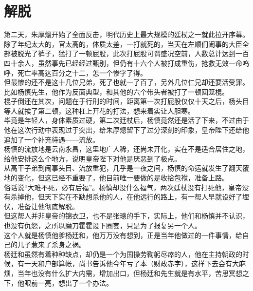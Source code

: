 \section{解脱}
\ifnum{}
	\begin{multicols}{\theparacolNo}
\fi
第二天，朱厚熜开始了全面反击，明代历史上最大规模的廷杖之一就此拉开序幕。\\

除了年纪太大的，官太高的，体质太差，一打就死的，当天在左顺们闹事的大臣全部被脱光了裤子，猛打了一顿屁股，此次打屁股可谓盛况空前，人数总计达到一百四十余人，虽然事先已经经过甄别，但仍有十六个人被打成重伤，抢救无效一命呜呼，死亡率高达百分之十二，怎一个惨字了得。\\

但最惨的还不是这十几位兄弟，死了也就一了百了，另外几位仁兄却还要活受罪。比如杨慎先生，他作为反面典型，和其他的六个带头者被打了一顿回笼棍。\\

棍子倒还在其次，问题在于行刑的时间，距离第一次打屁股仅仅十天之后，杨头目等人就挨了第二顿，这种杠上开花的打法，想来着实让人胆寒。\\

毕竟是年轻人，身体素质过硬，第二次廷杖后，杨慎竟然还是活了下来，不过由于他在这次行动中表现过于突出，给朱厚熜留下了过分深刻的印象，皇帝陛下还给他追加了一个补充待遇——流放。\\

杨慎的流放地是云南永昌，这里地广人稀，还尚未开化，实在不是适合居住之地，给他安排这么个地方，说明皇帝陛下对他是厌恶到了极点。\\

从高干子弟到闹事头目、流放重犯，几乎是一夜之间，杨慎的命运就发生了翻天覆地的变化，但这已经不重要了，他目前唯一要做的是收拾包袱，准备上路。\\

俗话说“大难不死，必有后福”。杨慎却没什么福气，两次廷杖没有打死他，皇帝没有杀掉他，但天下实在不缺想杀他的人，在他远行的路上，有一帮人早就设好了埋伏，准备让他彻底解脱。\\

但这帮人并非皇帝的锦衣卫，也不是张璁的手下，实际上，他们和杨慎并不认识，也没有仇怨，之所以磨刀霍霍设下圈套，只是为了报复另一个人。\\

这个人就是杨慎他爹杨廷和，他万万没有想到，正是当年他做过的一件事情，给自己的儿子惹来了杀身之祸。\\

杨廷和虽然有着种种缺点，却仍是一个为国操劳鞠躬尽瘁的人，他在主持朝政的时候，有一天和户部算帐，尚书告诉他今年亏了本（财政赤字），这样下去会有大麻烦，当年也没有什么扩大内需，增加出口，但杨廷和先生就是有水平，苦思冥想之下，他眼前一亮，想出了一个办法。\\


\end{multicols}
